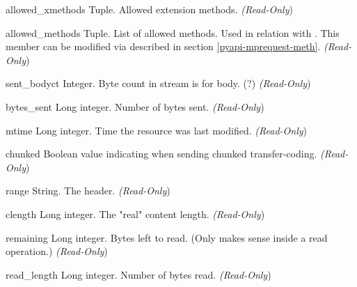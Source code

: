 \begin{memberdesc}[request]{allowed_xmethods}
Tuple. Allowed extension methods.
\emph{(Read-Only})
\end{memberdesc}

\begin{memberdesc}[request]{allowed_methods}
Tuple. List of allowed methods. Used in relation with
. This member can be modified via  
described in section \ref{pyapi-mprequest-meth}.
\emph{(Read-Only})
\end{memberdesc}

\begin{memberdesc}[request]{sent_bodyct}
Integer. Byte count in stream is for body. (?)
\emph{(Read-Only})
\end{memberdesc}

\begin{memberdesc}[request]{bytes_sent}
Long integer. Number of bytes sent.
\emph{(Read-Only})
\end{memberdesc}

\begin{memberdesc}[request]{mtime}
Long integer. Time the resource was last modified.
\emph{(Read-Only})
\end{memberdesc}

\begin{memberdesc}[request]{chunked}
Boolean value indicating when sending chunked transfer-coding.
\emph{(Read-Only})
\end{memberdesc}


\begin{memberdesc}[request]{range}
String. The  header.
\emph{(Read-Only})
\end{memberdesc}

\begin{memberdesc}[request]{clength}
Long integer. The "real" content length.
\emph{(Read-Only})
\end{memberdesc}

\begin{memberdesc}[request]{remaining}
Long integer. Bytes left to read. (Only makes sense inside a read
operation.)
\emph{(Read-Only})
\end{memberdesc}

\begin{memberdesc}[request]{read_length}
Long integer. Number of bytes read.
\emph{(Read-Only})
\end{memberdesc}

